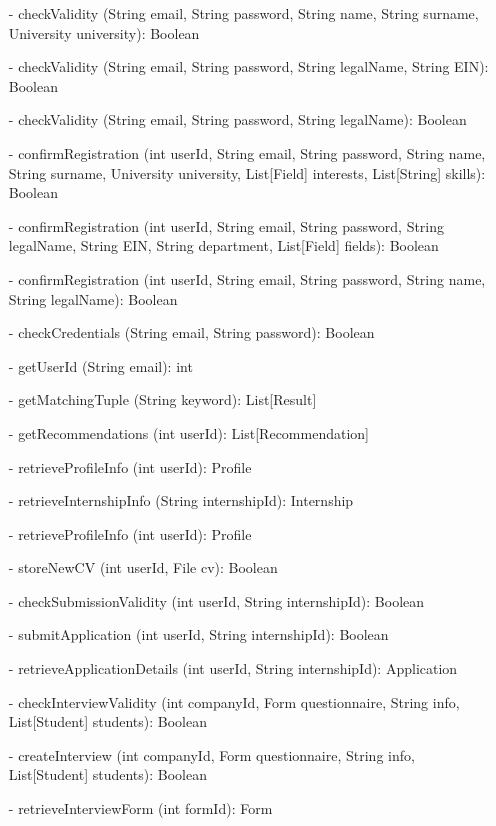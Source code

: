 \begin{itemize}
    \item[-] checkValidity (String email, String password, String name, String surname, University university): Boolean
    \item[-] checkValidity (String email, String password, String legalName, String EIN): Boolean
    \item[-] checkValidity (String email, String password, String legalName): Boolean
    \item[-] confirmRegistration (int userId, String email, String password, String name, String surname, University university, List[Field] interests, List[String] skills): Boolean
    \item[-] confirmRegistration (int userId, String email, String password, String legalName, String EIN, String department, List[Field] fields): Boolean
    \item[-] confirmRegistration (int userId, String email, String password, String name, String legalName): Boolean
    \item[-] checkCredentials (String email, String password): Boolean
    \item[-] getUserId (String email): int
    \item[-] getMatchingTuple (String keyword): List[Result]
    \item[-] getRecommendations (int userId): List[Recommendation]
    \item[-] retrieveProfileInfo (int userId): Profile
    \item[-] retrieveInternshipInfo (String internshipId): Internship
    \item[-] retrieveProfileInfo (int userId): Profile
    \item[-] storeNewCV (int userId, File cv): Boolean
    \item[-] checkSubmissionValidity (int userId, String internshipId): Boolean
    \item[-] submitApplication (int userId, String internshipId): Boolean
    \item[-] retrieveApplicationDetails (int userId, String internshipId): Application
    \item[-] checkInterviewValidity (int companyId, Form questionnaire, String info, List[Student] students): Boolean
    \item[-] createInterview (int companyId, Form questionnaire, String info, List[Student] students): Boolean
    \item[-] retrieveInterviewForm (int formId): Form

\end{itemize}
